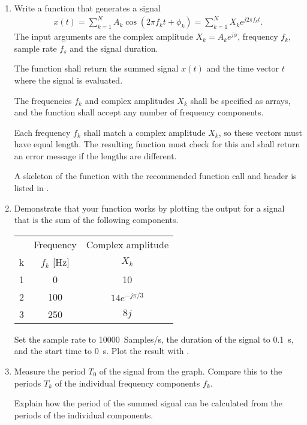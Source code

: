 \begin{enumerate}[1)]
	\item Write a function that generates a signal
	\begin{align}
		x(t)= \sum_{k=1}^{N} A_k \cos(2\pi f_k t + \phi_k) =\sum_{k=1}^{N} X_k e^{j2\pi f_k t}.
	\end{align}
	The input arguments are the complex amplitude $X_k=A_k e^{j\phi}$, frequency $f_k$, sample rate $f_s$ and the signal duration.
	
	The function shall return the summed signal $x(t)$ and the time vector $t$ where the signal is evaluated.
	
	The frequencies $f_k$ and complex amplitudes $X_k$ shall be specified as \numpy arrays, and the function shall accept any number of frequency components. 
	
	Each frequency $f_k$ shall match a complex amplitude $X_k$, so these vectors must have equal length. The resulting function must check for this and shall return an error message if the lengths are different. 
	
	A skeleton of the function with the recommended function call and header is listed in . 
		
	\item Demonstrate that your function works by plotting the output for a signal that is the sum of the following components.
	\begin{center}
		\begin{tabular}{ccc}
				&	Frequency	& Complex amplitude	\\
			k	&	$f_k$ [Hz]		& $X_k$  			\\
			\hline
			1	&	\num{0}		& \num{10}				\\
			2	&	\num{100}	& $14e^{-j\pi/3}$		\\
			3	&	\num{250}	& 	$8j$				\\
		\hline
		\end{tabular}
	\end{center}
	Set the sample rate to \qty{10000}{Samples/s}, the duration of the signal to \qty{0.1}{s}, and the start time to \qty{0}{s}. Plot the result with \matplotlib.
	
	\item Measure the period $T_0 $ of the signal from the graph. Compare this to the periods $T_k$ of the individual frequency components $f_k$.
	
	Explain how the period of the summed signal can be calculated from the periods of the individual components.
	

\end{enumerate}
